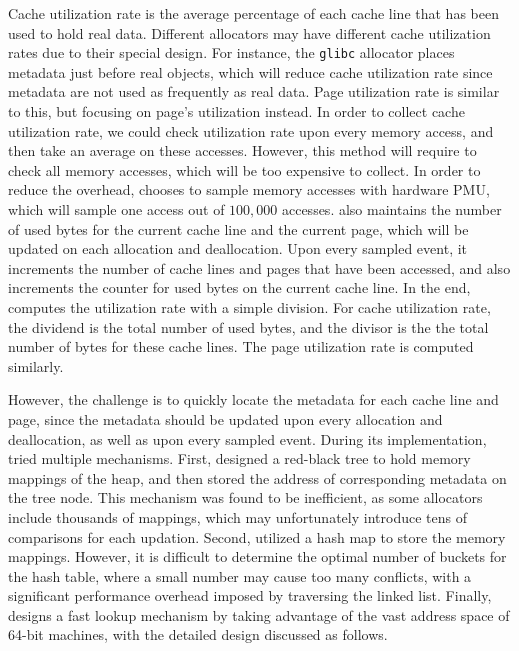 Cache utilization rate is the average percentage of each cache line that has been used to hold real data. Different allocators may have different cache utilization rates due to their special design. For instance, the \texttt{glibc} allocator places metadata just before real objects, which will reduce cache utilization rate since metadata are not used as frequently as real data. Page utilization rate is similar to this, but focusing on page's utilization instead. In order to collect cache utilization rate, we could check utilization rate upon every memory access, and then take an average on these accesses. However, this method will require to check all memory accesses, which will be too expensive to collect. In order to reduce the overhead, \MP{} chooses to sample memory accesses with hardware PMU, which will sample one access out of $100,000$ accesses. \MP{} also maintains the number of used bytes for the current cache line and the current page, which will be updated on each allocation and deallocation. Upon every sampled event, it increments the number of cache lines and pages that have been accessed, and also increments the counter for used bytes on the current cache line. In the end, \MP{} computes the utilization rate with a simple division. For cache utilization rate, the dividend is the total number of used bytes, and the divisor is the the total number of bytes for these cache lines. The page utilization rate is computed similarly.

However, the challenge is to quickly locate the metadata for each cache line and page, since the metadata should be updated upon every allocation and deallocation, as well as upon every sampled event. During its implementation, \MP{} tried multiple mechanisms. First, \MP{} designed a red-black tree to hold memory mappings of the heap, and then stored the address of corresponding metadata on the tree node. This mechanism was found to be inefficient, as some allocators include thousands of mappings, which may unfortunately introduce tens of comparisons for each updation. Second, \MP{} utilized a hash map to store the memory mappings. However, it is difficult to determine the optimal number of buckets for the hash table, where a small number may cause too many conflicts, with a significant performance overhead imposed by traversing the linked list. Finally, \MP{} designs a fast lookup mechanism by taking advantage of the vast address space of 64-bit machines, with the detailed design discussed as follows. 

